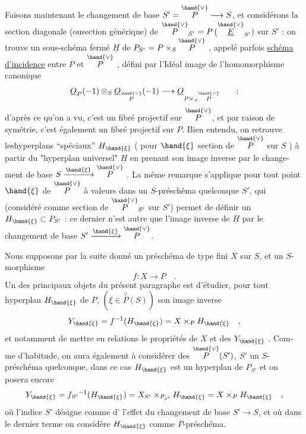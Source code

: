 
Faisons maintenant le changement de base $S'=\overset{\hand{\vee}}{P}\longrightarrow S$, et considérons
la section diagonale (ousection générique) de $\overset{\hand{\vee}}{P}_{S'} = P\,(\overset{\hand{\vee}}{\underline{E}}_{S'})$ sur $S'$ :
on trouve un sous-schéma fermé $\underline{H}$ de $P_{S'} = P\times_S\overset{\hand{\vee}}{P}$ , appelé parfois
\uline{schéma d'incidence} entre $P$ et $\overset{\hand{\vee}}{P}$ , défini par l'Idéal image de
l'homomorphisme canonique
\[ \underline{O}_P(-1)\otimes_S\underline{O}_{\overset{\hand{\vee}}{P}}(-1)\longrightarrow \underline{O}_{P\times_S\overset{\hand{\vee}}{P}} \qquad ; \]
d'après ce qu'on a vu, c'est un fibré projectif sur $\overset{\hand{\vee}}{P}$, et par raison de
symétrie, c'est également un fibré projectif sur $P$. Bien entendu, on
retrouve leshyperplans ``spéciaux'' $H_{\hand{\xi}}$ ( pour $\hand{\xi}$ section de $\overset{\hand{\vee}}{P}$ sur $S$ )\hand{,} à partir
du "hyperplan universel" $\underline{H}$\hand{,} en prenant son image inverse par le change-%
ment de base $S\xrightarrow{\hand{\xi}}\overset{\hand{\vee}}{P}$ . La même remarque s'applique pour tout point
$\hand{\xi}$ de $\overset{\hand{\vee}}{P}$ à valeurs dans un $S$-préschéma quelconque $S'$, qui (considéré comme
section de $\overset{\hand{\vee}}{P}_{S'}$ sur $S'$) permet de définir un $H_{\hand{\xi}}\subset P_{S'}$ : ce dernier n'est
autre que l'image inverse de $\underline{H}$ par le changement de base $S'\xrightarrow{\hand{\xi}}\overset{\hand{\vee}}{P}$.

Nous supposons par la suite donné un préschéma de type fini $X$ sur $S$,
et un $S$-morphisme
\[ f\colon X\longrightarrow P \quad . \]
\placedmargin{$|$}Un des principaux objets\hand{,} du présent paragraphe est d'étudier, pour tout
\placedmargin{$|$}hyperplan $H_{\hand{\xi}}$ de $P$, $(\xi\in\overset{\vee}{P}(S))$ son image inverse
\[ Y_{\hand{\xi}} = f^{-1}(H_{\hand{\xi}}) = X\times_P H_{\hand{\xi}} \quad , \]
et notamment de mettre en relations le propriétés de $X$ et des $Y_{\hand{\xi}}$ . Com-%
me d'habitude, on aura également à considérer des $\overset{\hand{\vee}}{P}(S')$, $S'$ 
un $S$-préschéma quelconque, dans ce cas $H_{\hand{\xi}}$ est un hyperplan de $P_{S'}$ \hand{,}
et on posera encore
\[ Y_{\hand{\xi}} = f_{S'}{}^{-1}(H_{\hand{\xi}}) = X_{S'}\times_{P_{S'}}H_{\hand{\xi}} = X\times_P H_{\hand{\xi}} \quad , \]
où l'indice $S'$ désigne comme d'  l'effet du changement de base
$S'\longrightarrow S$, et où dans le dernier terme on considère $H_{\hand{\xi}}$ comme $P$-préschéma.

